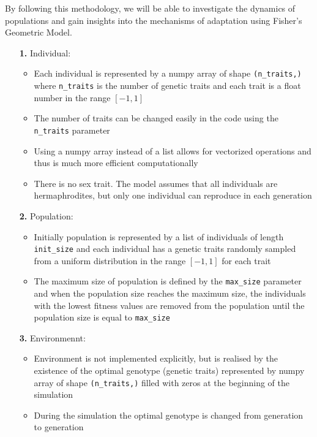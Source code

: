 \documentclass{article}
\begin{document}
By following this methodology, we will be able to investigate the dynamics of populations and gain insights into the mechanisms of adaptation using Fisher's Geometric Model.


\begin{itemize}
    \item[\textbf{1.}] Individual:
        \begin{itemize}
            \item Each individual is represented by a numpy array of shape \verb|(n_traits,)| where \verb|n_traits|
            is the number of genetic traits and each trait is a float number in the range $[-1, 1]$
            \item The number of traits can be changed easily in the code using the \verb|n_traits| parameter
            \item Using a numpy array instead of a list allows for vectorized operations and thus is much
            more efficient computationally
            \item There is no sex trait. The model assumes that all individuals are hermaphrodites, but only
            one individual can reproduce in each generation
        \end{itemize}
    \item[\textbf{2.}] Population:
        \begin{itemize}
            \item Initially population is represented by a list of individuals of length \verb|init_size|
            and each individual has a genetic traits randomly sampled from a uniform distribution 
            in the range $[-1, 1]$ for each trait
            \item The maximum size of population is defined by the \verb|max_size| parameter and 
            when the population size reaches the maximum size, the individuals with the lowest fitness
            values are removed from the population until the population size is equal to \verb|max_size|
        \end{itemize}
    \item[\textbf{3.}] Environmennt:
        \begin{itemize}
            \item Environment is not implemented explicitly, but is realised by the existence of the
            optimal genotype (genetic traits) represented by numpy array of shape \verb|(n_traits,)| filled
            with zeros at the beginning of the simulation 
            \item During the simulation the optimal genotype is changed from generation to generation 

\end{itemize}
\end{itemize}
\end{document}
